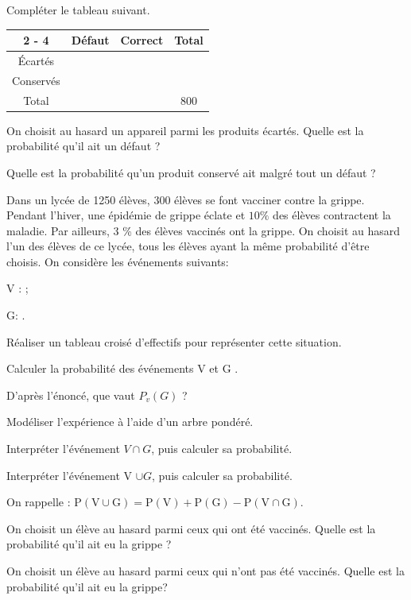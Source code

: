 \documentclass[11pt,a4paper]{book}
\begin{document}
\begin{enumMet}
	\item Compléter le tableau suivant.
	
\begin{tabular}{|c|c|c|c|}
	\cline { 2 - 4 } \multicolumn{1}{c|}{} & Défaut & Correct & Total \\
	\hline Écartés & & & \\
	\hline Conservés & & & \\
	\hline Total & & & 800 \\
	\hline
\end{tabular}
	\item On choisit au hasard un appareil parmi les produits écartés.
	Quelle est la probabilité qu'il ait un défaut ?
	\item Quelle est la probabilité qu'un produit conservé ait malgré tout un défaut ?
\end{enumMet}


Dans un lycée de 1250 élèves, 300 élèves se font vacciner contre la grippe.
Pendant l'hiver, une épidémie de grippe éclate et $10 \%$ des élèves contractent la maladie.
Par ailleurs, 3 \% des élèves vaccinés ont la grippe. On choisit au hasard l'un des élèves de ce lycée, tous les élèves ayant la même probabilité d'être choisis.
On considère les événements suivants:
\begin{itemMet}
	\item V : ;
	\item G: .
\end{itemMet}
\begin{enumMet}
	\item Réaliser un tableau croisé d'effectifs pour représenter cette situation.
	\item Calculer la probabilité des événements V et G .
	\item D'après l'énoncé, que vaut $P_v(G)$ ?
	\item Modéliser l'expérience à l'aide d'un arbre pondéré.
	\item Interpréter l'événement $V \cap G$, puis calculer sa probabilité.
	\item Interpréter l'événement V $\cup G$, puis calculer sa probabilité.
	\begin{baide}
	On rappelle : $\mathrm{P}(\mathrm{V} \cup \mathrm{G})=\mathrm{P}(\mathrm{V})+\mathrm{P}(\mathrm{G})-\mathrm{P}(\mathrm{V} \cap \mathrm{G})$.
	\end{baide}
	\item On choisit un élève au hasard parmi ceux qui ont été vaccinés.
	Quelle est la probabilité qu'il ait eu la grippe ?
	\item On choisit un élève au hasard parmi ceux qui n'ont pas été vaccinés.
	Quelle est la probabilité qu'il ait eu la grippe?
\end{enumMet}
\end{document}
